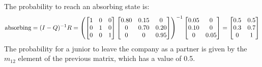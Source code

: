 \begin{example}
    The probability to reach an absorbing state is:
    \[\textnormal{absorbing}=(I-Q)^{-1}R=
    \left(  
        \begin{bmatrix}
            1       & 0     & 0  \\
            0       & 1     & 0  \\
            0       & 0     & 1  \\
        \end{bmatrix}
        \begin{bmatrix}
            0.80    & 0.15  & 0     \\
            0       & 0.70  & 0.20  \\
            0       & 0     & 0.95  \\
        \end{bmatrix}
    \right)^{-1}
    \begin{bmatrix}
        0.05    & 0     \\
        0.10    & 0     \\
        0       & 0.05  \\
    \end{bmatrix}
    =        
    \begin{bmatrix}
        0.5     & 0.5   \\
        0.3     & 0.7   \\
        0       & 1     \\
    \end{bmatrix}\]
    The probability for a junior to leave the company as a partner is given by the $m_{12}$ element of the previous matrix, which has a value of 0.5.
\end{example}